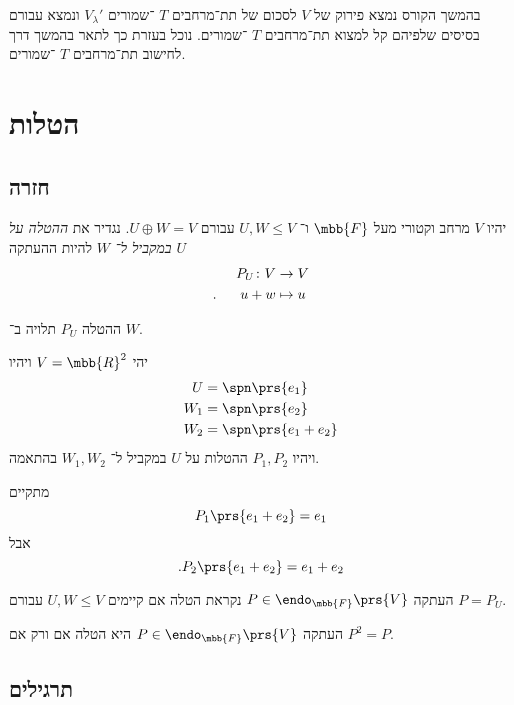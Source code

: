 \documentclass[a4paper,10pt,oneside,openany]{article}
\begin{document}
\begin{remark}
בהמשך הקורס נמצא פירוק של
$V$
לסכום של תת־מרחבים
$T$%
־שמורים
$V_{\lambda}'$
ונמצא עבורם בסיסים שלפיהם קל למצוא תת־מרחבים
$T$%
־שמורים.
נוכל בעזרת כך לתאר בהמשך דרך לחישוב תת־מרחבים
$T$%
־שמורים.
\end{remark}

\section{הטלות}

\subsection{חזרה}

\begin{definition}
יהיו
$V$
מרחב וקטורי מעל
$\mbb{F}$
ו־%
$U,W \leq V$
עבורם
$U \oplus W = V$.
נגדיר את
\emph{ההטלה על
$U$
במקביל ל־%
$W$}
להיות ההעתקה
\begin{align*}
P_U \colon V &\to V \\
\text{.} \hphantom{lala} u+w &\mapsto u
\end{align*}
\end{definition}

\begin{remark}
ההטלה
$P_U$
תלויה ב־%
$W$.
\end{remark}

\begin{example}
יהי
$V = \mbb{R}^2$
ויהיו
\begin{align*}
U &= \spn\prs{e_1} \\
W_1 &= \spn\prs{e_2} \\
W_2 &= \spn\prs{e_1 + e_2}
\end{align*}
ויהיו
$P_1, P_2$
ההטלות על
$U$
במקביל ל־%
$W_1, W_2$
בהתאמה.

מתקיים
\[P_1 \prs{e_1 + e_2} = e_1\]
אבל
\[\text{.} P_2 \prs{e_1 + e_2} = e_1 + e_2\]
\end{example}

\begin{definition}[הטלה]
העתקה
$P \in \endo_{\mbb{F}}\prs{V}$
נקראת הטלה אם קיימים
$U,W \leq V$
עבורם
$P = P_U$.
\end{definition}

\begin{fact}
העתקה
$P \in \endo_{\mbb{F}}\prs{V}$
היא הטלה אם ורק אם
$P^2 = P$.
\end{fact}

\subsection{תרגילים}
\end{document}
